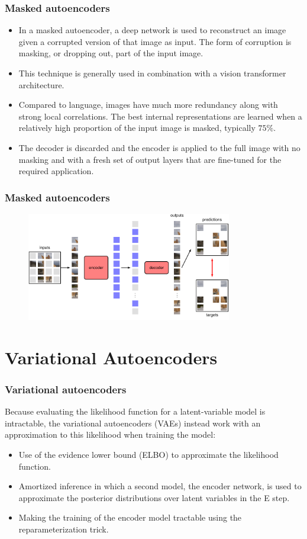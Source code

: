\documentclass{beamer}
\begin{document}
\begin{frame}
    \frametitle{Masked autoencoders}
    \begin{itemize}
        \item In a masked autoencoder, a deep network is used to reconstruct an image given a corrupted version of that image as input. The form of corruption is masking, or dropping out, part of the input image.
        \item This technique is generally used in combination with a vision transformer architecture.
        \item Compared to language, images have much more redundancy along with strong local correlations. The best internal representations are learned when a relatively high proportion of the input image is masked, typically $75\%$.
        \item The decoder is discarded and the encoder is applied to the full image with no masking and with a fresh set of output layers that are fine-tuned for the required application.
    \end{itemize}
\end{frame}

\begin{frame}
    \frametitle{Masked autoencoders}
    \begin{figure}
        \includegraphics[width=0.8\textwidth]{Figure_5.pdf}
    \end{figure}
\end{frame}

\section{Variational Autoencoders}

\begin{frame}
    \frametitle{Variational autoencoders}
    Because evaluating the likelihood function for a latent-variable model is intractable, the variational autoencoders (VAEs) instead work with an approximation to this likelihood when training the model:
    \begin{itemize}
        \item Use of the evidence lower bound (ELBO) to approximate the likelihood function.
        \item Amortized inference in which a second model, the encoder network, is used to approximate the posterior distributions over latent variables in the E step.
        \item Making the training of the encoder model tractable using the reparameterization trick.
    \end{itemize}
\end{frame}
\end{document}
